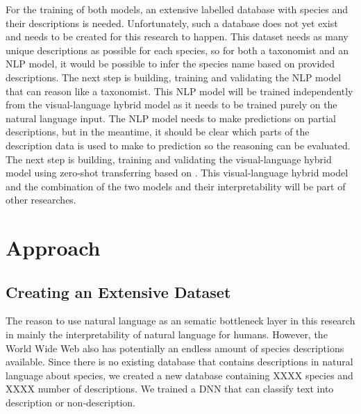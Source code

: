 \documentclass[a4paper, 12pt, oneside]{book} %
\begin{document}
For the training of both models, an extensive labelled database with species and their descriptions is needed. 
Unfortunately, such a database does not yet exist and needs to be created for this research to happen.
This dataset needs as many unique descriptions as possible for each species, so for both a taxonomist and an NLP model, it would be possible to infer the species name based on provided descriptions.
The next step is building, training and validating the NLP model that can reason like a taxonomist.
This NLP model will be trained independently from the visual-language hybrid model as it needs to be trained purely on the natural language input. 
The NLP model needs to make predictions on partial descriptions, but in the meantime, it should be clear which parts of the description data is used to make to prediction so the reasoning can be evaluated.
The next step is building, training and validating the visual-language hybrid model using zero-shot transferring based on \textcite{radford_learning_2021}.
This visual-language hybrid model and the combination of the two models and their interpretability will be part of other researches.

\section{Approach}
\subsection{Creating an Extensive Dataset}
The reason to use natural language as an sematic bottleneck layer in this research in mainly the interpretability of natural language for humans. 
However, the World Wide Web also has potentially an endless amount of species descriptions available.
Since there is no existing database that contains descriptions in natural language about species, we created a new database containing XXXX species and XXXX number of descriptions.
We trained a DNN that can classify text into description or non-description. 
\end{document}
